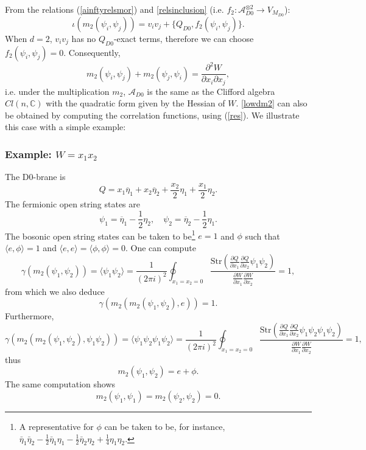 \documentclass[a4paper,11pt]{article}
\def\cA{\mathcal{A}}
\numberwithin{equation}{section}
\begin{document}
From the relations (\ref{ainftyrelsmor}) and \eqref{relsinclusion} (i.e. 
$f_{2}:\mathcal{A}_{D0}^{\otimes 2}\rightarrow V_{M_{D0}}$):
\begin{equation}
\iota(m_2(\psi_i,\psi_j)) = v_i v_j + \{ Q_{D0}, f_2(\psi_i,\psi_j) \}.
\end{equation}
When $d=2$, $v_i v_j$ has no $Q_{D0}$-exact terms, therefore we can choose $f_2 
(\psi_i,\psi_j) = 0$. Consequently,
\begin{equation}\label{lowdm2}
m_2 (\psi_i,\psi_j) + m_2(\psi_j,\psi_i) = \frac{\partial^2 W}{\partial x_i 
\partial x_j},
\end{equation}
i.e. under the multiplication $m_2$, $\cA_{D0}$ is the same as the Clifford algebra $Cl(n,\mathbb{C})$ with the quadratic form given by the Hessian of $W$. 
\eqref{lowdm2} can also be obtained by computing the correlation functions, 
using (\ref{res}). We illustrate this case with a simple example:

\subsubsection*{Example: $W = x_1 x_2$}

The D0-brane is
\begin{equation}
Q = x_1 \overline{\eta}_1 + x_2 \overline{\eta}_2 + \frac{x_2}{2} \eta_1 + 
\frac{x_1}{2} \eta_2.
\end{equation}
The fermionic open string states are
\begin{equation}
\psi_1 = \overline{\eta}_1 - \frac{1}{2} \eta_2, \quad \psi_2 = \overline{\eta}_2 - \frac{1}{2} \eta_1.
\end{equation}
The bosonic open string states can be taken to be\footnote{A representative 
for $\phi$ can be taken to be, for instance, 
$\bar{\eta}_{1}\bar{\eta}_{2}-\frac{1}{2}\bar{\eta}_{1}\eta_{1}-\frac{1}{2}\bar{
\eta}_{2}\eta_{2}+\frac{1}{4}\eta_{1}\eta_{2}$.} $e =1$ and $\phi$ such 
that $\langle e,\phi\rangle=1$ and $\langle e,e\rangle=\langle 
\phi,\phi\rangle=0$. One can compute
\begin{equation}
\gamma(m_2(\psi_1,\psi_2)) = \langle \psi_1 \psi_2 \rangle = \frac{1}{(2 \pi 
i)^2} \oint_{x_1 = x_2 =0} \frac{\mathrm{Str}\left( \frac{\partial Q}{\partial 
x_1} \frac{\partial Q}{\partial x_2} \psi_1 \psi_2 \right)}{\frac{\partial 
W}{\partial x_1} \frac{\partial W}{\partial x_2}} = 1,
\end{equation}
from which we also deduce
\[
\gamma(m_2(m_2(\psi_1,\psi_2),e)) = 1.
\]
Furthermore,
\[
\gamma(m_2(m_2(\psi_1,\psi_2),\psi_1\psi_2)) = \langle \psi_1 \psi_2 \psi_1 
\psi_2 \rangle = \frac{1}{(2 \pi i)^2} \oint_{x_1 = x_2 =0} 
\frac{\mathrm{Str}\left( \frac{\partial Q}{\partial x_1} \frac{\partial 
Q}{\partial x_2} \psi_1 \psi_2 \psi_1 \psi_2 \right)}{\frac{\partial 
W}{\partial x_1} \frac{\partial W}{\partial x_2}} = 1,
\]
thus
\[
m_2(\psi_1,\psi_2) = e + \phi.
\]
The same computation shows
\[
m_2(\psi_1,\psi_1) = m_2(\psi_2,\psi_2) = 0.
\]
\end{document}
